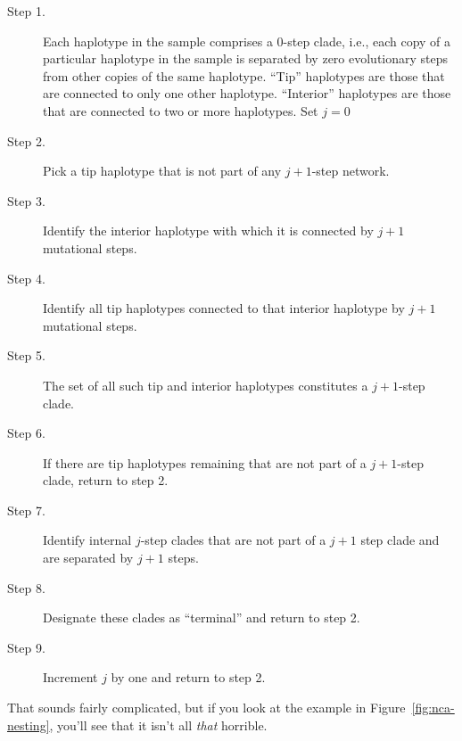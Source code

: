 \begin{description}

\item[Step 1.] Each haplotype in the sample comprises a 0-step clade,
  i.e., each copy of a particular haplotype in the sample is separated
  by zero evolutionary steps from other copies of the same
  haplotype. ``Tip'' haplotypes are those that are connected to only
  one other haplotype. ``Interior'' haplotypes are those that are
  connected to two or more haplotypes. Set $j=0$

\item[Step 2.] Pick a tip haplotype that is not part of any $j+1$-step
  network.

\item[Step 3.] Identify the interior haplotype with which it is
  connected by $j+1$ mutational steps.

\item[Step 4.] Identify all tip haplotypes connected to that interior
  haplotype by $j+1$ mutational steps.

\item[Step 5.] The set of all such tip and interior haplotypes
  constitutes a $j+1$-step clade.

\item[Step 6.] If there are tip haplotypes remaining that are not part
  of a $j+1$-step clade, return to step 2.

\item[Step 7.] Identify internal $j$-step clades that are not part of
  a $j+1$ step clade and are separated by $j+1$ steps.

\item[Step 8.] Designate these clades as ``terminal'' and return to
  step 2.

\item[Step 9.] Increment $j$ by one and return to step 2.

\end{description}

\noindent That sounds fairly complicated, but if you look at the
example in Figure~\ref{fig:nca-nesting}, you'll see that it isn't all
{\it that\/} horrible.

